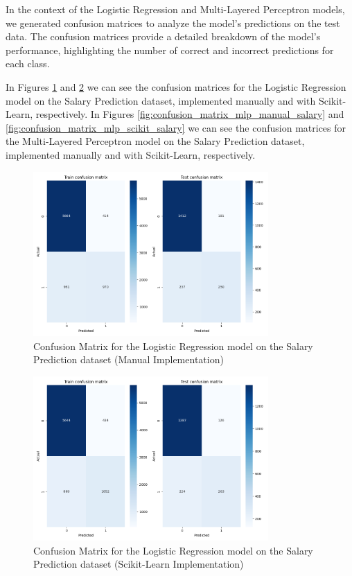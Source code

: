 \documentclass[runningheads]{paper}
\begin{document}
In the context of the Logistic Regression and Multi-Layered Perceptron models, we
generated confusion matrices to analyze the model's predictions on the test data.
The confusion matrices provide a detailed breakdown of the model's performance,
highlighting the number of correct and incorrect predictions for each class.

In Figures \ref{fig:confusion_matrix_logistic_manual_salary} and 
\ref{fig:confusion_matrix_logistic_scikit_salary} we can see the confusion matrices
for the Logistic Regression model on the Salary Prediction dataset, implemented
manually and with Scikit-Learn, respectively. In Figures 
\ref{fig:confusion_matrix_mlp_manual_salary} and \ref{fig:confusion_matrix_mlp_scikit_salary}
we can see the confusion matrices for the Multi-Layered Perceptron model on the
Salary Prediction dataset, implemented manually and with Scikit-Learn, respectively.

\begin{figure}[H]
    \centering
    \includegraphics[width=0.8\textwidth]{../tema2_SalaryPrediction/LogisticRegression/confusion_matrix_manual.png}
    \caption{Confusion Matrix for the Logistic Regression model on the Salary Prediction dataset (Manual Implementation)}
    \label{fig:confusion_matrix_logistic_manual_salary}
\end{figure}

\begin{figure}[H]
    \centering
    \includegraphics[width=0.8\textwidth]{../tema2_SalaryPrediction/LogisticRegression/confusion_matrix_scikit-learn.png}
    \caption{Confusion Matrix for the Logistic Regression model on the Salary Prediction dataset (Scikit-Learn Implementation)}
    \label{fig:confusion_matrix_logistic_scikit_salary}
\end{figure}
\end{document}
